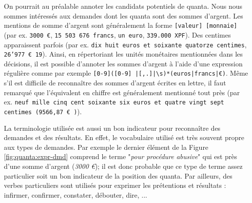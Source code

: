 On pourrait au préalable annoter les candidats potentiels de quanta. Nous nous sommes intéressés aux demandes dont les quanta sont des sommes d'argent. Les mentions de somme d'argent sont généralement la forme \og \texttt{[valeur] [monnaie]} \fg{} (par ex. \texttt{3000 \euro}, \texttt{15 503 676 francs}, \texttt{un euro}, \texttt{339.000 XPF}). Des centimes apparaissent parfois (par ex. \texttt{dix huit euros et soixante quatorze centimes}, \texttt{26'977 \euro{}  19}).  Ainsi, en répertoriant les unités monétaires mentionnées dans les décisions, il est possible d'annoter les sommes d'argent à l'aide d'une expression régulière comme par exemple \texttt{[0-9]([0-9] |[,.]|\textbackslash s)*(euros|francs|\euro)}. Même s'il est difficile de reconnaître des sommes d'argent écrites en lettre, il faut remarqué que l'équivalent en chiffre est généralement mentionné tout près (par ex. \texttt{neuf mille cinq cent soixante six euros et quatre vingt sept centimes (9566,87 \euro{}  )}). 

La terminologie utilisée est aussi un bon indicateur pour reconnaître des demandes et des résultats. En effet, le vocabulaire utilisé est très souvent propre aux types de demandes. Par exemple le dernier élément de la Figure \ref{fig:quanta:expr-dmd} comprend le terme "\textit{pour procédure abusive}" qui est près d'une somme d'argent (\textit{3000 \euro{}}); il est donc probable que ce type de terme assez particulier soit un bon indicateur de la position des quanta. Par ailleurs, des verbes particuliers sont utilisés pour exprimer les prétentions et résultats : infirmer, confirmer, constater, débouter, dire, ... %


